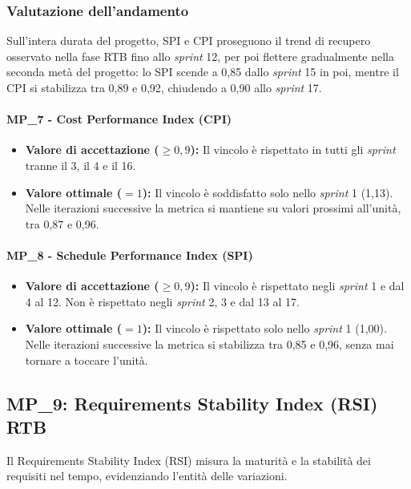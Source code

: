 \documentclass[12pt, a4paper]{article}
\begin{document}
\subsubsection*{Valutazione dell'andamento}
Sull'intera durata del progetto, SPI e CPI proseguono il trend di recupero osservato nella fase RTB fino allo \textit{sprint} 12, per poi flettere gradualmente nella seconda metà del progetto: lo SPI scende a 0,85 dallo \textit{sprint} 15 in poi, mentre il CPI si stabilizza tra 0,89 e 0,92, chiudendo a 0,90 allo \textit{sprint} 17.

\paragraph*{MP\_7 - Cost Performance Index (CPI)}
\begin{itemize}
    \item \textbf{Valore di accettazione ($\ge 0,9$):} Il vincolo è rispettato in tutti gli \textit{sprint} tranne il 3, il 4 e il 16.
    \item \textbf{Valore ottimale ($= 1$):} Il vincolo è soddisfatto solo nello \textit{sprint} 1 (1,13). Nelle iterazioni successive la metrica si mantiene su valori prossimi all'unità, tra 0,87 e 0,96.
\end{itemize}

\paragraph*{MP\_8 - Schedule Performance Index (SPI)}
\begin{itemize}
    \item \textbf{Valore di accettazione ($\ge 0,9$):} Il vincolo è rispettato negli \textit{sprint} 1 e dal 4 al 12. Non è rispettato negli \textit{sprint} 2, 3 e dal 13 al 17.
    \item \textbf{Valore ottimale ($= 1$):} Il vincolo è rispettato solo nello \textit{sprint} 1 (1,00). Nelle iterazioni successive la metrica si stabilizza tra 0,85 e 0,96, senza mai tornare a toccare l'unità.
\end{itemize}

\subsection{MP\_9: Requirements Stability Index (RSI) RTB}
Il Requirements Stability Index (RSI) misura la maturità e la stabilità dei requisiti nel tempo, evidenziando l’entità delle variazioni.
\end{document}
